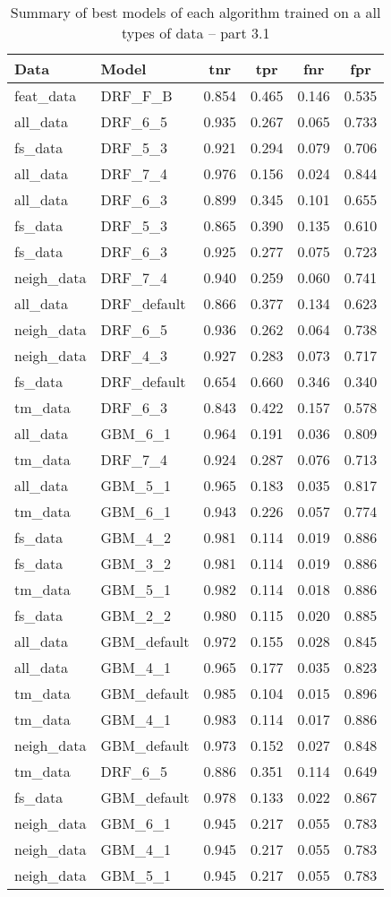 \documentclass[thesis=M,english]{FITthesis}[2012/10/20]
\begin{document}
\begin{table}[H]\centering
\begin{small}
    \caption{Summary of best models of each algorithm trained on a all types of data -- part 3.1}\label{tab:all_data_summary_3_1}
    \begin{tabular}{|l|l|c|c|c|c|}\hline
Data & Model & \gls{tnr} & \gls{tpr} & \gls{fnr} & \gls{fpr} \tabularnewline \hline \hline
feat\_data & DRF\_F\_B & 0.854 & 0.465 & 0.146 & 0.535 \tabularnewline  \hline 
all\_data & DRF\_6\_5 & 0.935 & 0.267 & 0.065 & 0.733 \tabularnewline  \hline 
fs\_data & DRF\_5\_3 & 0.921 & 0.294 & 0.079 & 0.706 \tabularnewline  \hline 
all\_data & DRF\_7\_4 & 0.976 & 0.156 & 0.024 & 0.844 \tabularnewline  \hline 
all\_data & DRF\_6\_3 & 0.899 & 0.345 & 0.101 & 0.655 \tabularnewline  \hline 
fs\_data & DRF\_5\_3 & 0.865 & 0.390 & 0.135 & 0.610 \tabularnewline  \hline 
fs\_data & DRF\_6\_3 & 0.925 & 0.277 & 0.075 & 0.723 \tabularnewline  \hline 
neigh\_data & DRF\_7\_4 & 0.940 & 0.259 & 0.060 & 0.741 \tabularnewline  \hline 
all\_data & DRF\_default & 0.866 & 0.377 & 0.134 & 0.623 \tabularnewline  \hline 
neigh\_data & DRF\_6\_5 & 0.936 & 0.262 & 0.064 & 0.738 \tabularnewline  \hline 
neigh\_data & DRF\_4\_3 & 0.927 & 0.283 & 0.073 & 0.717 \tabularnewline  \hline 
fs\_data & DRF\_default & 0.654 & 0.660 & 0.346 & 0.340 \tabularnewline  \hline 
tm\_data & DRF\_6\_3 & 0.843 & 0.422 & 0.157 & 0.578 \tabularnewline  \hline 
all\_data & GBM\_6\_1 & 0.964 & 0.191 & 0.036 & 0.809 \tabularnewline  \hline 
tm\_data & DRF\_7\_4 & 0.924 & 0.287 & 0.076 & 0.713 \tabularnewline  \hline 
all\_data & GBM\_5\_1 & 0.965 & 0.183 & 0.035 & 0.817 \tabularnewline  \hline 
tm\_data & GBM\_6\_1 & 0.943 & 0.226 & 0.057 & 0.774 \tabularnewline  \hline 
fs\_data & GBM\_4\_2 & 0.981 & 0.114 & 0.019 & 0.886 \tabularnewline  \hline 
fs\_data & GBM\_3\_2 & 0.981 & 0.114 & 0.019 & 0.886 \tabularnewline  \hline 
tm\_data & GBM\_5\_1 & 0.982 & 0.114 & 0.018 & 0.886 \tabularnewline  \hline 
fs\_data & GBM\_2\_2 & 0.980 & 0.115 & 0.020 & 0.885 \tabularnewline  \hline 
all\_data & GBM\_default & 0.972 & 0.155 & 0.028 & 0.845 \tabularnewline  \hline 
all\_data & GBM\_4\_1 & 0.965 & 0.177 & 0.035 & 0.823 \tabularnewline  \hline 
tm\_data & GBM\_default & 0.985 & 0.104 & 0.015 & 0.896 \tabularnewline  \hline 
tm\_data & GBM\_4\_1 & 0.983 & 0.114 & 0.017 & 0.886 \tabularnewline  \hline 
neigh\_data & GBM\_default & 0.973 & 0.152 & 0.027 & 0.848 \tabularnewline  \hline 
tm\_data & DRF\_6\_5 & 0.886 & 0.351 & 0.114 & 0.649 \tabularnewline  \hline 
fs\_data & GBM\_default & 0.978 & 0.133 & 0.022 & 0.867 \tabularnewline  \hline 
neigh\_data & GBM\_6\_1 & 0.945 & 0.217 & 0.055 & 0.783 \tabularnewline  \hline 
neigh\_data & GBM\_4\_1 & 0.945 & 0.217 & 0.055 & 0.783 \tabularnewline  \hline 
neigh\_data & GBM\_5\_1 & 0.945 & 0.217 & 0.055 & 0.783 \tabularnewline  \hline 
    \end{tabular}
\end{small}
\end{table}
\end{document}
